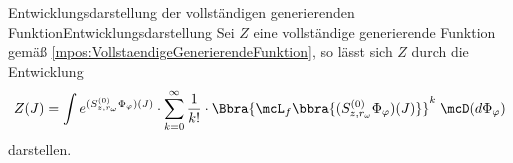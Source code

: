 \begin{mpos}{Entwicklungsdarstellung der vollständigen generierenden Funktion}{Entwicklungsdarstellung}
    Sei $Z$ eine vollständige generierende Funktion gemäß \ref{mpos:VollstaendigeGenerierendeFunktion}, so lässt sich $Z$ durch die Entwicklung
    \[
        Z(J) = \int e^{(S_{z,r_\omega}^{(0)}\Phi_\varphi)(J)}\cdot
        \sum_{k=0}^\infty \frac{1}{k!}\cdot\Bbra{\mcL_f\bbra{(S_{z,r_\omega}^{(0)}\Phi_\varphi)(J)}}^k\;\mcD(d\Phi_\varphi)
    \]
    darstellen.
\end{mpos}